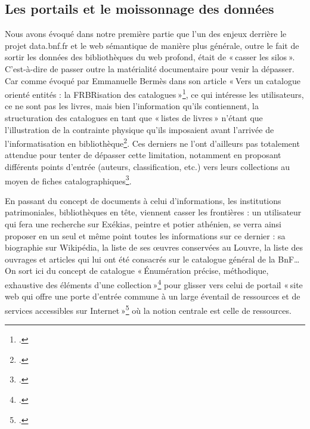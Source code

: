 \subsection{Les portails et le moissonnage des données}



Nous avons évoqué dans notre première partie que l’un des enjeux derrière le projet data.bnf.fr et le web sémantique de manière plus générale, outre le fait de sortir les données des bibliothèques du web profond, était de « casser les silos ». C’est-à-dire de passer outre la matérialité documentaire pour venir la dépasser. Car comme évoqué par Emmanuelle Bermès dans son article « Vers un catalogue orienté entités : la FRBRisation des catalogues »\footcite{bermes_vers_2016}, ce qui intéresse les utilisateurs, ce ne sont pas les livres, mais bien l’information qu’ils contiennent, la structuration des catalogues en tant que « listes de livres » n’étant que l’illustration de la contrainte physique qu’ils imposaient avant l’arrivée de l’informatisation en bibliothèque\footcite[§ 2]{bermes_vers_2016}. Ces derniers ne l’ont d’ailleurs pas totalement attendue pour tenter de dépasser cette limitation, notamment en proposant différents points d’entrée (auteurs, classification, etc.) vers leurs collections au moyen de fiches catalographiques\footcite[§ 5]{bermes_vers_2016}.

En passant du concept de documents à celui d’informations, les institutions patrimoniales, bibliothèques en tête, viennent casser les frontières : un utilisateur qui fera une recherche sur Exékias, peintre et potier athénien, se verra ainsi proposer en un seul et même point toutes les informations sur ce dernier : sa biographie sur Wikipédia, la liste de ses œuvres conservées au Louvre, la liste des ouvrages et articles qui lui ont été consacrés sur le catalogue général de la BnF… On sort ici du concept de catalogue « Énumération précise, méthodique, exhaustive des éléments d’une collection »\footcite{zotero-197} pour glisser vers celui de portail « site web qui offre une porte d’entrée commune à un large éventail de ressources et de services accessibles sur Internet »\footcite{2024} où la notion centrale est celle de ressources.

